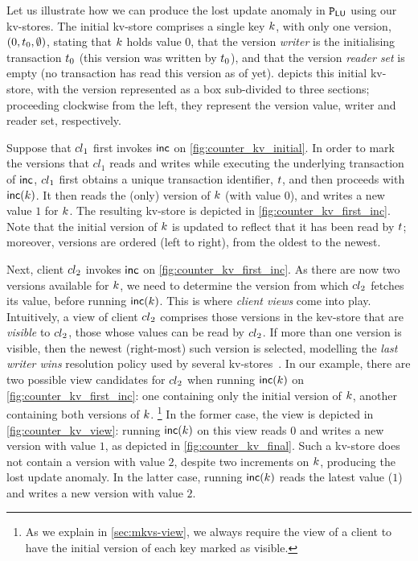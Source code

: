 Let us illustrate how we can produce the lost update anomaly in $\mathtt{P}_{\mathsf{LU}}$ using our kv-stores. 
The initial kv-store comprises a single key $k$, with only one 
version, $(0, t_{0}, \emptyset)$, stating that $k$ holds value $0$, 
that the version \emph{writer} is the initialising transaction $t_0$ (this version was written by $t_0$), 
and that the version \emph{reader set} is empty (no transaction has read this version as of yet). 
 depicts this initial kv-store, with the version
represented as a box sub-divided to three sections;
proceeding clockwise from the left, they represent the version value, writer and reader set, respectively.

Suppose that ${cl}_1$ first invokes $\mathsf{inc}$ on \cref{fig:counter_kv_initial}. 
In order to mark the versions that $cl_1$ reads and writes while executing the underlying transaction of $\mathsf{inc}$,  
${cl}_1$ first obtains a unique transaction identifier, $t$, 
and then proceeds with $\mathsf{inc}(k)$. 
It then reads the (only) version of $k$ (with value $0$), 
and writes a new value $1$ for $k$. 
The resulting kv-store is depicted in \cref{fig:counter_kv_first_inc}.
Note that the initial version of $k$ is updated to reflect that it has been read by $t$; 
moreover, versions are ordered (left to right), from the oldest to the newest.

Next, client ${cl}_2$ invokes $\mathsf{inc}$ on \cref{fig:counter_kv_first_inc}. 
As there are now two versions available for $k$, 
we need to determine the version from which ${cl}_2$ fetches its value, before running $\mathsf{inc}(k)$.
This is where \emph{client views} come into play.
Intuitively, a view of client ${cl}_2$ comprises those versions in the kev-store that are \emph{visible} to ${cl}_2$, 
\ie those whose values can be read by ${cl}_2$. 
If more than one version is visible, then the newest (right-most) such version is selected, 
modelling the \emph{last writer wins} resolution policy used by several kv-stores~\cite{vogels:2009:ec:1435417.1435432}. 
In our example, there are two possible view candidates for ${cl}_2$ when running $\mathsf{inc}(k)$ on \cref{fig:counter_kv_first_inc}: 
one containing only the initial version of $k$, 
another containing both versions of $k$.%
\footnote{
As we explain in \cref{sec:mkvs-view}, we always require the view of a client 
to have the initial version of each key marked as visible.}
In the former case, the view is depicted in \cref{fig:counter_kv_view}:
running $\mathsf{inc}(k)$ on this view reads $0$ and writes a new version with value $1$, as depicted in \cref{fig:counter_kv_final}.
Such a kv-store does not contain a version with value $2$, despite two increments on $k$, producing the lost update anomaly.
In the latter case, running $\mathsf{inc}(k)$ reads the latest value ($1$) and writes a new version with value $2$.

